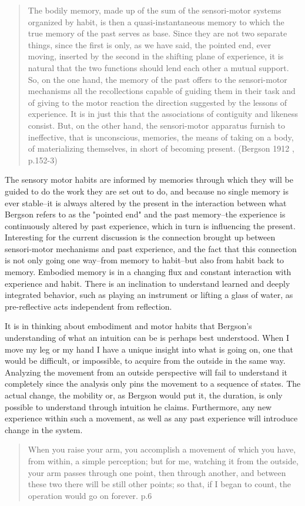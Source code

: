 \documentclass[11pt]{article}
\makeatletter
\newcommand{\cslcitation}[2]
 {\protect\hyper@linkstart{cite}{citeproc_bib_item_#1}#2\hyper@linkend}
\makeatother
\begin{document}
\begin{quote}
The bodily memory, made up of the sum of the sensori-motor systems organized by habit, is then a quasi-instantaneous memory to which the true memory of the past serves as base. Since they are not two separate things, since the first is only, as we have said, the pointed end, ever moving, inserted by the second in the shifting plane of experience, it is natural that the two functions should lend each other a mutual support. So, on the one hand, the memory of the past offers to the sensori-motor mechanisms all the recollections capable of guiding them in their task and of giving to the motor reaction the direction suggested by the lessons of experience. It is in just this that the associations of contiguity and likeness consist. But, on the other hand, the sensori-motor apparatus furnish to ineffective, that is unconscious, memories, the means of taking on a body, of materializing themselves, in short of becoming present. (\cslcitation{2}{Bergson 1912} , p.152-3)
\end{quote}

The sensory motor habits are informed by memories through which they will be guided to do the work they are set out to do, and because no single memory is ever stable--it is always altered by the present in the interaction between what Bergson refers to as the "pointed end" and the past memory--the experience is continuously altered by past experience, which in turn is influencing the present.
Interesting for the current discussion is the connection brought up between sensori-motor mechanisms and past experience, and the fact that this connection is not only going one way--from memory to habit--but also from habit back to memory.
Embodied memory is in a changing flux and constant interaction with experience and habit.
There is an inclination to understand learned and deeply integrated behavior, such as playing an instrument or lifting a glass of water, as pre-reflective acts independent from reflection.

It is in thinking about embodiment and motor habits that Bergson's understanding of what an intuition can be is perhaps best understood.
When I move my leg or my hand I have a unique insight into what is going on, one that would be difficult, or impossible, to acquire from the outside in the same way.
Analyzing the movement from an outside perspective will fail to understand it completely since the analysis only pins the movement to a sequence of states.
The actual change, the mobility or, as Bergson would put it, the duration, is only possible to understand through intuition he claims.
Furthermore, any new experience within such a movement, as well as any past experience will introduce change in the system.
\begin{quote}
When you raise your arm, you accomplish a movement of which you have, from within, a simple perception; but for me, watching it from the outside, your arm passes through one point, then through another, and between these two there will be still other points; so that, if I began to count, the operation would go on forever. p.6
\end{quote}
\end{document}
